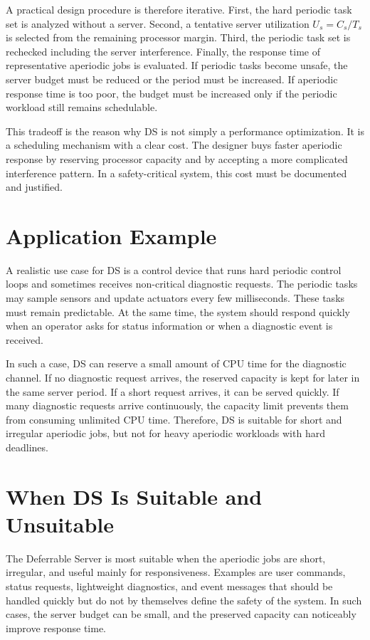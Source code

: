 \documentclass[conference]{IEEEtran}
\begin{document}
	A practical design procedure is therefore iterative. First, the hard periodic task set is analyzed without a server. Second, a tentative server utilization $U_s=C_s/T_s$ is selected from the remaining processor margin. Third, the periodic task set is rechecked including the server interference. Finally, the response time of representative aperiodic jobs is evaluated. If periodic tasks become unsafe, the server budget must be reduced or the period must be increased. If aperiodic response time is too poor, the budget must be increased only if the periodic workload still remains schedulable.
	
	This tradeoff is the reason why DS is not simply a performance optimization. It is a scheduling mechanism with a clear cost. The designer buys faster aperiodic response by reserving processor capacity and by accepting a more complicated interference pattern. In a safety-critical system, this cost must be documented and justified.
	
	\section{Application Example}
	
	A realistic use case for DS is a control device that runs hard periodic control loops and sometimes receives non-critical diagnostic requests. The periodic tasks may sample sensors and update actuators every few milliseconds. These tasks must remain predictable. At the same time, the system should respond quickly when an operator asks for status information or when a diagnostic event is received.
	
	In such a case, DS can reserve a small amount of CPU time for the diagnostic channel. If no diagnostic request arrives, the reserved capacity is kept for later in the same server period. If a short request arrives, it can be served quickly. If many diagnostic requests arrive continuously, the capacity limit prevents them from consuming unlimited CPU time. Therefore, DS is suitable for short and irregular aperiodic jobs, but not for heavy aperiodic workloads with hard deadlines.
	
	\section{When DS Is Suitable and Unsuitable}
	
	The Deferrable Server is most suitable when the aperiodic jobs are short, irregular, and useful mainly for responsiveness. Examples are user commands, status requests, lightweight diagnostics, and event messages that should be handled quickly but do not by themselves define the safety of the system. In such cases, the server budget can be small, and the preserved capacity can noticeably improve response time.
	
\end{document}
